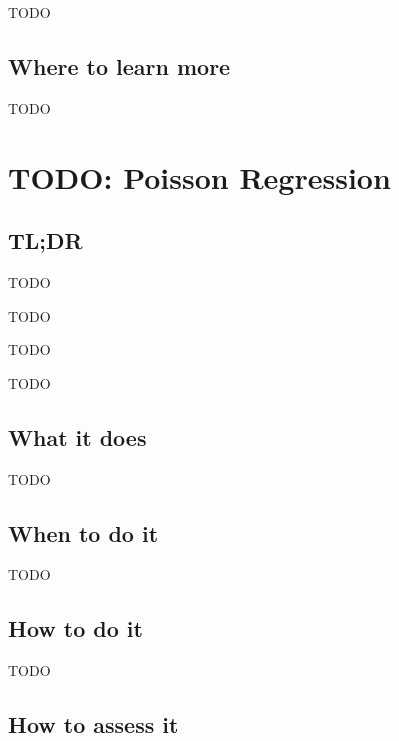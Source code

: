 \documentclass[
]{book}
\providecommand{\tightlist}{%
  \setlength{\itemsep}{0pt}\setlength{\parskip}{0pt}}
\begin{document}
TODO

\hypertarget{where-to-learn-more-6}{%
\section{Where to learn more}\label{where-to-learn-more-6}}

TODO

\hypertarget{poisson-regression}{%
\chapter{TODO: Poisson Regression}\label{poisson-regression}}

\hypertarget{tldr-7}{%
\section{TL;DR}\label{tldr-7}}

\begin{description}
\tightlist
\item[What it does]
TODO
\item[When to do it]
TODO
\item[How to do it]
TODO
\item[How to assess it]
TODO
\end{description}

\hypertarget{what-it-does-7}{%
\section{What it does}\label{what-it-does-7}}

TODO

\hypertarget{when-to-do-it-7}{%
\section{When to do it}\label{when-to-do-it-7}}

TODO

\hypertarget{how-to-do-it-7}{%
\section{How to do it}\label{how-to-do-it-7}}

TODO

\hypertarget{how-to-assess-it-7}{%
\section{How to assess it}\label{how-to-assess-it-7}}
\end{document}
